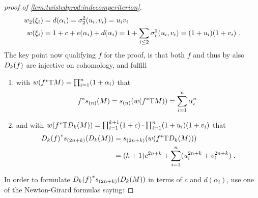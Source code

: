 \begin{proof}[proof of \autoref{lem:twistedprod:indecompcriterion}]
\begin{align*}
    {w_{2}}(\xi_i) &= d(\alpha_i)   = \sigma_{2}^{2}(u_i, v_i) = u_iv_i \\
    {w}(\xi_i)  &= 1+c+e(\alpha_i)+d(\alpha_i)
                 = 1+\sum_{i\leq2}\sigma_{i}^{2}(u_i,v_i) = (1+u_i)(1+v_i)
                 \;.
  \end{align*}
  The key point now qualifying $f$ for the proof, is that both $f$ and
  thus by
  also $D_{k}({f})$ are injective on cohomology, and fulfill
  \begin{enumerate}
  \item with ${w}({f}^*\mathrm{T}M) = \prod_{i=1}^n (1+\alpha_i)$ that
    \begin{gather}\label{eq:lem:twistedprod:indecompcriterion:sM}
      {f}^* s_{(n)}(M)
      = s_{(n)}({w}({f}^*\mathrm{T}M))
      = \sum_{i=1}^n \alpha_i^n
      \;
    \end{gather}
  \item and with
    ${w}({f}^*\mathrm{T}D_{k}({M}))
    = \prod_{i=1}^{k+1}(1+c) \cdot \prod_{i=1}^n
    (1+u_i)(1+v_i)$
    that
    \begin{align}\notag
      {D_{k}({f})}^* s_{(2n+k)}(D_{k}({M}))
      &= s_{(2n+k)}({w}({f}^*\mathrm{T}D_{k}({M}))) \\
      \label{eq:lem:twistedprod:indecompcriterion:sDkM}
      &= (k+1)c^{2n+k} + \sum_{i=1}^n (u_i^{2n+k} + v_i^{2n+k})
        \;.
    \end{align}
  \end{enumerate}
  In order to formulate
  ${D_{k}({f})}^*s_{(2n+k)}(D_{k}({M}))$ 
  in terms of $c$ and $d(\alpha_i)$,
  use one of the Newton-Girard formulas saying:
\end{proof}
